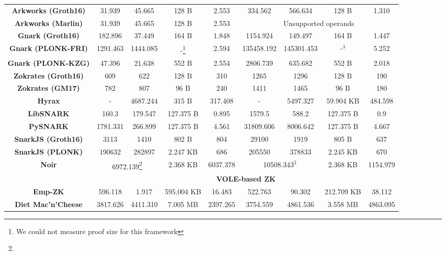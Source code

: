 \begin{table*}[htb]
{\begin{tabular}{ccccc|cccc}
   \textbf{Arkworks (Groth16) \cite{arkworks}} & 31.939 & 45.665 & 128 B & 2.553 & 334.562 & 566.634 & 128 B & 1.310 \\
   \textbf{Arkworks (Marlin) \cite{arkworks}} & 31.939 & 45.665 & 128 B & 2.553 & \multicolumn{4}{c}{Unsupported operands} \\
   \textbf{Gnark (Groth16) \cite{gnark-v0.9.0}} & 182.896 & 37.449 & 164 B & 1.848 & 1154.924 & 149.497 & 164 B & 1.447 \\
  \textbf{Gnark (PLONK-FRI) \cite{gnark-v0.9.0}} & 1291.463 & 1444.085 & -\footnote{We could not measure proof size for this framework} & 2.594 & 135458.192 & 145301.453 & -$^3$ & 5.252 \\
   \textbf{Gnark (PLONK-KZG) \cite{gnark-v0.9.0}} & 47.396 & 21.638 & 552 B & 2.554 & 2806.739 & 635.682 & 552 B & 2.018 \\
  \textbf{Zokrates (Groth16) \cite{arkworks}} & 609 & 622 & 128 B & 310 & 1265 & 1296 & 128 B & 190 \\
    \textbf{Zokrates (GM17) \cite{arkworks}} & 782 & 807 & 96 B & 240 & 1411 & 1465 & 96 B & 180 \\
   \textbf{Hyrax \cite{hyraxZK}} & - & 4687.244 & 315 B & 317.408 & - & 5497.327 & 59.904 KB & 484.598 \\
   \textbf{LibSNARK \cite{libsnark}} & 160.3 & 179.547 & 127.375 B & 0.895 & 1579.5 & 588.2 & 127.375 B & 0.9 \\
   \textbf{PySNARK \cite{PySNARK}} & 1781.331 & 266.899 & 127.375 B & 4.561 & 31809.606 & 8006.642 & 127.375 B & 4.667 \\
   \textbf{SnarkJS (Groth16) \cite{baylina2020iden3}} & 3113 & 1410 & 802 B & 804 & 29100 & 1919 & 805 B & 637 \\
      \textbf{SnarkJS (PLONK) \cite{baylina2020iden3}} & 190632 & 282897 & 2.247 KB & 686 & 205550 & 378833 & 2.245 KB & 670 \\
  \textbf{Noir \cite{Noir2023Documentation}} & \multicolumn{2}{c}{6972.139\footnote{}} & 2.368 KB & 6037.378 & \multicolumn{2}{c}{10508.343$^2$} & 2.368 KB & 1154.979 \\
    \midrule
    & \multicolumn{8}{c}{\textbf{VOLE-based ZK}} \\
    \midrule
    \textbf{Emp-ZK \cite{empzk}} & 596.118 & 1.917 & 595.004 KB & 16.483 & 522.763 & 90.302 & 212.709 KB & 38.112 \\
    \textbf{Diet Mac'n'Cheese \cite{dietmc}} & 3817.626 & 4411.310 & 7.005 MB & 2397.265 & 3754.559 & 4861.536 & 3.558 MB & 4863.095 \\


\end{tabular}}
\end{table*}
